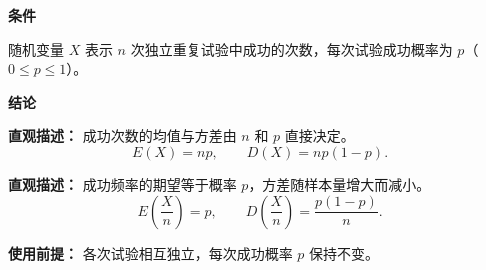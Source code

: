 \begin{statementbox}
	\textbf{\textcolor{CStatement}{条件}}
	\begin{description}[style=nextline, leftmargin=2.8em, labelsep=0.5em, itemsep=0.35em]
		\item[\textbf{\textcolor{CStatement}{条件 1（$n$ 重伯努利试验）：}}]
			随机变量 $X$ 表示 $n$ 次独立重复试验中成功的次数，每次试验成功概率为 $p$（$0 \le p \le 1$）。
	\end{description}
	\textbf{\textcolor{CStatement}{结论}}
	\begin{description}[style=nextline, leftmargin=2.8em, labelsep=0.5em, itemsep=0.45em]
		\item[\textbf{\textcolor{CStatement}{结论一（期望与方差）：}}]
			\textbf{\textcolor{CStatement}{直观描述：}}
			成功次数的均值与方差由 $n$ 和 $p$ 直接决定。
			\[
				E(X)=np,
				\qquad
				D(X)=np(1-p).
			\]
		\item[\textbf{\textcolor{CStatement}{推广结论（样本比例）：}}]
			\textbf{\textcolor{CStatement}{直观描述：}}
			成功频率的期望等于概率 $p$，方差随样本量增大而减小。
			\[
				E\!\left(\frac{X}{n}\right)=p,
				\qquad
				D\!\left(\frac{X}{n}\right)=\frac{p(1-p)}{n}.
			\]
	\end{description}
	\textbf{\textcolor{CStatement}{使用前提：}}
	各次试验相互独立，每次成功概率 $p$ 保持不变。
\end{statementbox}

